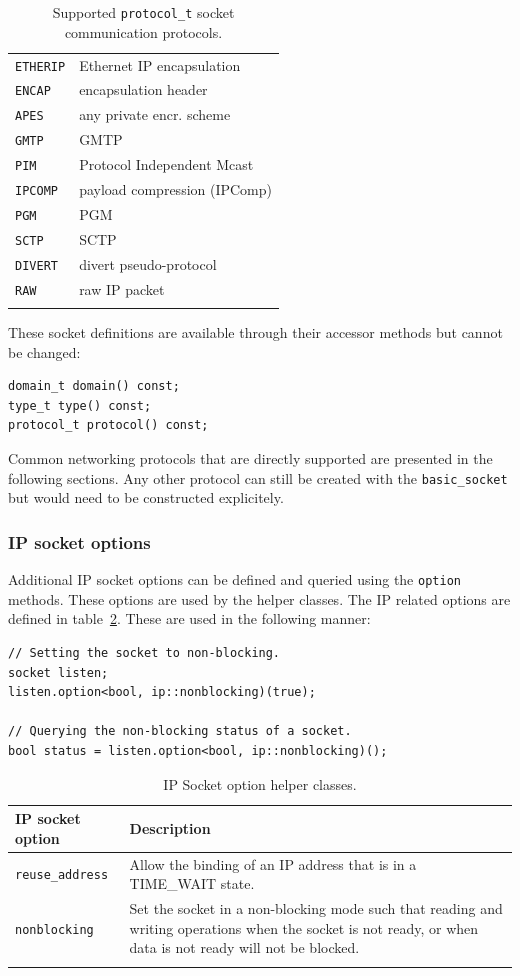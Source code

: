 \documentclass[10pt,a4paper,openany]{mudbook}
\begin{document}
\begin{longtable}{l|p{}}
  \texttt{ETHERIP} & Ethernet IP encapsulation \\
  \texttt{ENCAP} & encapsulation header \\
  \texttt{APES} & any private encr. scheme \\
  \texttt{GMTP} & GMTP \\
  \texttt{PIM} & Protocol Independent Mcast \\
  \texttt{IPCOMP} & payload compression (IPComp) \\
  \texttt{PGM} & PGM \\
  \texttt{SCTP} & SCTP \\
  \texttt{DIVERT} & divert pseudo-protocol \\
  \texttt{RAW} & raw IP packet \\
  \caption{Supported \texttt{protocol\_t} socket communication protocols.}
  \label{tbl:protocol_t}
\end{longtable}

These socket definitions are available through their accessor methods but
cannot be changed:

\begin{lstlisting}[style=definition]
domain_t domain() const;
type_t type() const;
protocol_t protocol() const;
\end{lstlisting}

Common networking protocols that are directly supported are presented in
the following sections. Any other protocol can still be created with the
\texttt{basic\_socket} but would need to be constructed explicitely.

\subsubsection{IP socket options}

Additional IP socket options can be defined and queried using the
\texttt{option} methods. These options are used by the helper classes. The
IP related options are defined in table~\ref{tbl:ip-options}. These are used
in the following manner:

\begin{lstlisting}[style=snippet]
// Setting the socket to non-blocking.
socket listen;
listen.option<bool, ip::nonblocking)(true);

// Querying the non-blocking status of a socket.
bool status = listen.option<bool, ip::nonblocking)();
\end{lstlisting}

\begin{longtable}{l|p{}}
  \textbf{IP socket option} & \textbf{Description}  \\
  \hline
  \texttt{reuse\_address} & Allow the binding of an IP address that is in a
      TIME\_WAIT state. \\
  \texttt{nonblocking} & Set the socket in a non-blocking mode such that
      reading and writing operations when the socket is not ready, or when
      data is not ready will not be blocked. \\
  \caption{IP Socket option helper classes.}
  \label{tbl:ip-options}
\end{longtable}
\end{document}
